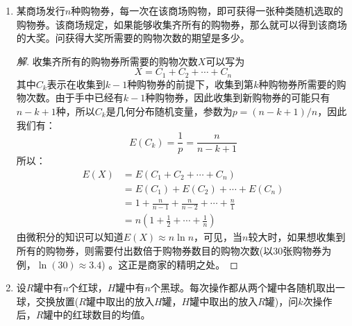 \documentclass[12pt]{article}
\newcommand{\hei}{\CJKfamily{hei}}                          %
\begin{document}
\begin{enumerate}
\item {\hei 某商场发行$n$种购物券，每一次在该商场购物，即可获得一张种类随机选取的购物券。该商场规定，如果能够收集齐所有的购物券，那么就可以得到该商场的大奖。问获得大奖所需要的购物次数的期望是多少。}

\begin{proof}[解]
	收集齐所有的购物券所需要的购物次数$X$可以写为
	\begin{equation}
	X=C_1+C_2+\cdots+C_n
	\end{equation}
	其中$C_k$表示在收集到$k-1$种购物券的前提下，收集到第$k$种购物券所需要的购物次数。由于手中已经有$k-1$种购物券，因此收集到新购物券的可能只有$n-k+1$种，所以$C_k$是几何分布随机变量，参数为$p=(n-k+1)/n$，因此我们有：
	\begin{equation}
	E(C_k)=\frac{1}{p}=\frac{n}{n-k+1}
	\end{equation}
	所以：
	\begin{equation}
	\begin{aligned}
	E(X)&=E(C_1+C_2+\cdots+C_n)\\
	&=E(C_1)+E(C_2)+\cdots+E(C_n) \\
	&=1+\frac{n}{n-1}+\frac{n}{n-2}+\cdots+\frac{n}{1} \\
	&=n\left(1+\frac{1}{2}+\cdots+\frac{1}{n}\right)
	\end{aligned}
	\end{equation}
	由微积分的知识可以知道$E(X)\approx n\ln n$，可见，当$n$较大时，如果想收集到所有的购物券，则需要付出数倍于购物券数目的购物次数(以30张购物券为例，$\ln(30)\approx3.4$) 。这正是商家的精明之处。
\end{proof}

\item {\hei 设$R$罐中有$n$个红球，$H$罐中有$n$个黑球。每次操作都从两个罐中各随机取出一球，交换放置($R$罐中取出的放入$H$罐，$H$罐中取出的放入$R$罐)，问$k$次操作后，$R$罐中的红球数目的均值。}


\end{enumerate}
\end{document}
